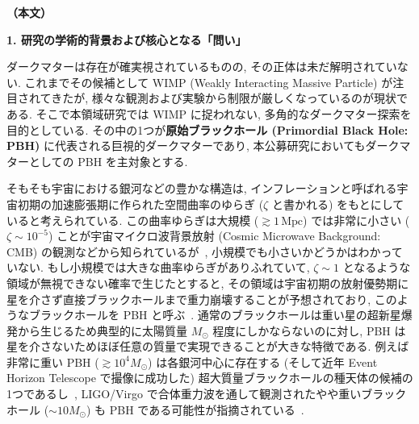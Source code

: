 \documentclass[11pt,a4paper,uplatex,dvipdfmx]{ujarticle} 		%
\newcommand{\研究課題名}{曲率ゆらぎの統計と原始ブラックホール量の精密対応}
\newcommand{\研究機関名}{名古屋大学}
\newcommand{\研究代表者氏名}{多田祐一郎}
\newcommand{\研究期間の最終元号年度}{4}  %
\renewcommand{\emph}[1]{{\sffamily\gtfamily\bfseries #1}}
\begin{document}

\newpage
\noindent
\textbf{（本文）}

\begin{mdframed}[roundcorner=0.5zw,
	innertopmargin=0.8zw,innerbottommargin=0.8zw,
	linecolor=black!50,linewidth=0.2zw,
	backgroundcolor=black!10]
	{\bfseries\gtfamily\sffamily\large 1. 研究の学術的背景および核心となる「問い」}
\end{mdframed}

\noindent
ダークマターは存在が確実視されているものの, その正体は未だ解明されていない.
これまでその候補として WIMP (Weakly Interacting Massive Particle) が注目されてきたが, 様々な観測および実験から制限が厳しくなっているのが現状である.
そこで本領域研究では WIMP に捉われない, 多角的なダークマター探索を目的としている.
その中の1つが\emph{原始ブラックホール (Primordial Black Hole: PBH)} に代表される巨視的ダークマターであり,
本公募研究においてもダークマターとしての PBH を主対象とする.

そもそも宇宙における銀河などの豊かな構造は, インフレーションと呼ばれる宇宙初期の加速膨張期に作られた空間曲率のゆらぎ ($\zeta$ と書かれる) をもとにしていると考えられている.
この曲率ゆらぎは大規模 ($\gtrsim1\,\mathrm{Mpc}$) では非常に小さい ($\zeta\sim10^{-5}$) ことが宇宙マイクロ波背景放射 (Cosmic Microwave Background: CMB) の観測などから知られているが~\cite{Aghanim:2018eyx},
小規模でも小さいかどうかはわかっていない.
もし小規模では大きな曲率ゆらぎがありふれていて, $\zeta\sim1$ となるような領域が無視できない確率で生じたとすると, その領域は宇宙初期の放射優勢期に星を介さず直接ブラックホールまで重力崩壊することが予想されており,
このようなブラックホールを PBH と呼ぶ~\cite{Carr:1974nx}.
通常のブラックホールは重い星の超新星爆発から生じるため典型的に太陽質量 $M_\odot$ 程度にしかならないのに対し,
PBH は星を介さないためほぼ任意の質量で実現できることが大きな特徴である.
例えば非常に重い PBH ($\gtrsim10^4M_\odot$) は各銀河中心に存在する (そして近年 Event Horizon Telescope で撮像に成功した) 超大質量ブラックホールの種天体の候補の1つであるし~\cite{Carr:2018rid},
LIGO/Virgo で合体重力波を通して観測されたやや重いブラックホール ($\sim10M_\odot$) も PBH である可能性が指摘されている~\cite{Sasaki:2018dmp}.
\end{document}
